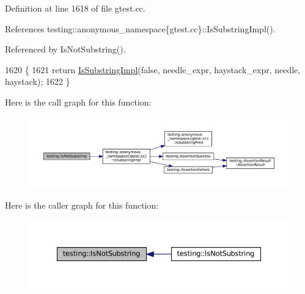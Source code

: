 Definition at line 1618 of file gtest.\+cc.



References testing\+::anonymous\+\_\+namespace\{gtest.\+cc\}\+::\+Is\+Substring\+Impl().



Referenced by Is\+Not\+Substring().


\begin{DoxyCode}
1620                                               \{
1621   \textcolor{keywordflow}{return} \hyperlink{namespacetesting_1_1anonymous__namespace_02gtest_8cc_03_a0e1cb1e2b03a87a9c893322e4caab670}{IsSubstringImpl}(\textcolor{keyword}{false}, needle\_expr, haystack\_expr, needle, haystack);
1622 \}
\end{DoxyCode}
Here is the call graph for this function\+:
\nopagebreak
\begin{figure}[H]
\begin{center}
\leavevmode
\includegraphics[width=350pt]{namespacetesting_a2288dcf4249f88af67dcd46544dc49a6_cgraph}
\end{center}
\end{figure}
Here is the caller graph for this function\+:
\nopagebreak
\begin{figure}[H]
\begin{center}
\leavevmode
\includegraphics[width=350pt]{namespacetesting_a2288dcf4249f88af67dcd46544dc49a6_icgraph}
\end{center}
\end{figure}
\mbox{\label{namespacetesting_a53e5c6e91ea429c43de7f4f57e33d166}} 
